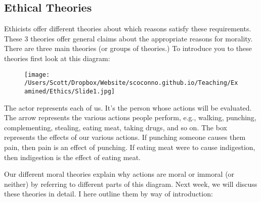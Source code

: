 \documentclass[9pt]{article}
\begin{document}
\subsection{Ethical Theories}\label{ethical-theories}

Ethicists offer different theories about which reasons satisfy these
requirements. These 3 theories offer general claims about the
appropriate reasons for morality. There are three main theories (or
groups of theories.) To introduce you to these theories first look at
this diagram:\begin{figure}
\centering
\texttt{[image: /Users/Scott/Dropbox/Website/scoconno.github.io/Teaching/Examined/Ethics/Slide1.jpg]}
\end{figure}

The actor represents each of us. It's the person whose actions will be
evaluated. The arrow represents the various actions people perform,
e.g., walking, punching, complementing, stealing, eating meat, taking
drugs, and so on. The box represents the effects of our various actions.
If punching someone causes them pain, then pain is an effect of
punching. If eating meat were to cause indigestion, then indigestion is
the effect of eating meat.

Our different moral theories explain why actions are moral or immoral
(or neither) by referring to different parts of this diagram. Next week,
we will discuss these theories in detail. I here outline them by way of
introduction:
\end{document}
